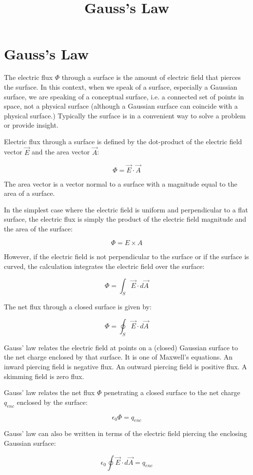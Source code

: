 \documentclass{article}
\title{Gauss's Law}
\begin{document}
\section{Gauss's Law}

The electric flux $\Phi$ through a surface is the amount of electric field that pierces the surface. In this context, when we speak of a surface, especially a Gaussian surface, we are speaking of a conceptual surface, i.e. a connected set of points in space, not a physical surface (although a Gaussian surface can coincide with a physical surface.) Typically the surface is in a convenient way to solve a problem or provide insight. 

Electric flux through a surface is defined by the \@{dot-product} of the electric field vector $\vec{E}$ and the area vector $\vec{A}$:

\[ \Phi = \vec{E} \cdot \vec{A} \]

The area vector is a vector normal to a surface with a \@{magnitude} equal to the area of a surface.

In the simplest case where the electric field is uniform and perpendicular to a flat surface, the electric flux is simply the product of the electric field magnitude and the area of the surface:

\[ \Phi = E \times A \]

However, if the electric field is not perpendicular to the surface or if the surface is curved, the calculation integrates the electric field over the surface:

\[ \Phi = \int_S \vec{E} \cdot d \vec{A} \]

The net flux through a closed surface is given by:

\[ \Phi = \oint_S \vec{E} \cdot d \vec{A} \]

Gauss' law relates the electric field at points on a (closed) Gaussian surface to the net charge enclosed by that surface. It is one of Maxwell's equations. An inward piercing field is negative flux. An outward piercing field is positive flux. A skimming field is zero flux.

Gauss' law relates the net flux $\Phi$ penetrating a closed surface to the net charge $q_{enc}$ enclosed by the surface:

\[ \epsilon_0 \Phi = q_{enc} \]

Gauss' law can also be written in terms of the electric field piercing the enclosing Gaussian surface:

\[ \epsilon_0 \oint \vec{E} \cdot d \vec{A} = q_{enc} \] 
\end{document}
